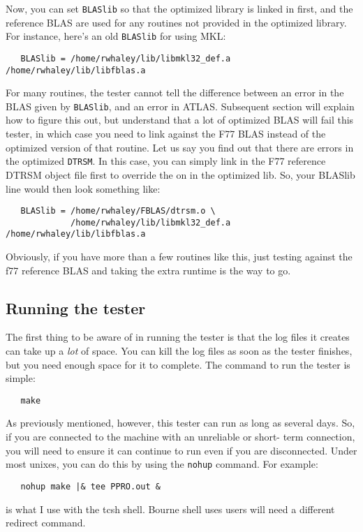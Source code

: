 \documentclass[11pt]{article}
\begin{document}
{Now, you can  set {\tt BLASlib} so that the optimized library is linked in
first, and the reference BLAS are used for any routines not provided in
the optimized library.  For instance, here's an old {\tt BLASlib} for using
MKL:
\begin{verbatim}
   BLASlib = /home/rwhaley/lib/libmkl32_def.a /home/rwhaley/lib/libfblas.a
\end{verbatim}

For many routines, the tester cannot tell the difference between an error
in the BLAS given by {\tt BLASlib}, and an error in ATLAS.  Subsequent
section will explain how to figure this out, but understand that
a lot of optimized BLAS will fail this tester, in which case you need
to link against the F77 BLAS instead of the optimized version of that
routine.  Let us say you find out that there are errors in the
optimized {\tt DTRSM}.  In this case, you can simply link in the F77 reference
DTRSM object file first to override the on in the optimized lib.  So, your
BLASlib line would then look something like:
\begin{verbatim}
   BLASlib = /home/rwhaley/FBLAS/dtrsm.o \
             /home/rwhaley/lib/libmkl32_def.a /home/rwhaley/lib/libfblas.a
\end{verbatim}

Obviously, if you have more than a few routines like this, just testing
against the f77 reference BLAS and taking the extra runtime is the way to
go.


\subsection{Running the tester}
The first thing to be aware of in running the tester is that the log files
it creates can take up a {\em lot} of space.  You can kill the log files
as soon as the tester finishes, but you need enough space for it to complete.
The command to run the tester is simple:
\begin{verbatim}
   make
\end{verbatim}

As previously mentioned, however, this tester can run as long as several
days.  So, if you are connected to the machine with an unreliable or short-
term connection, you will need to ensure it can continue to run even if
you are disconnected.  Under most unixes, you can do this by using the
{\tt nohup} command.  For example:
\begin{verbatim}
   nohup make |& tee PPRO.out &
\end{verbatim}
is what I use with the tcsh shell.  Bourne shell uses users will need a
different redirect command.
}
\end{document}
